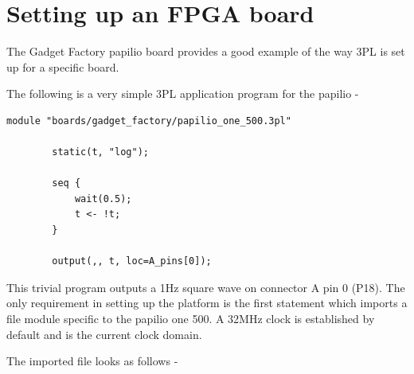 \pagebreak

\chapter{Setting up an FPGA board}\label{chap:boardsetup}
    
    The Gadget Factory papilio board provides a good example of
    the way 3PL is set up for a specific board.
    
    The following is a very simple 3PL application program for the papilio -
    
    \begin{lstlisting}[gobble=8, language=threepl]
        module "boards/gadget_factory/papilio_one_500.3pl"

        static(t, "log");

        seq {
            wait(0.5);
            t <- !t;
        }

        output(,, t, loc=A_pins[0]);
    \end{lstlisting}
    
    This trivial program outputs a 1Hz square wave on connector A pin 0 (P18).
    The only requirement in setting up the platform is the first statement
    which imports a file module specific to the papilio one 500.
    A 32MHz clock is established by default and is the current clock domain.
    
    The imported file looks as follows -

